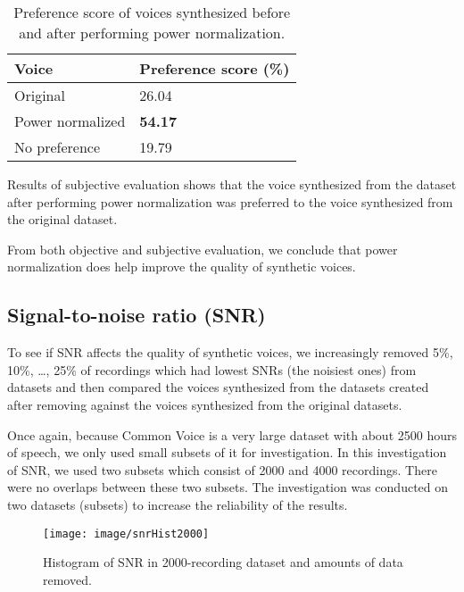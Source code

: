 \documentclass[12pt]{article}
\begin{document}
\begin{table}[]
\begin{center}
\caption{Preference score of voices synthesized before and after performing power normalization.}
\label{tab_subEvaPower}
\vspace{3mm}
\begin{tabular}{|l|l|}
\hline
Voice & Preference score (\%) \\
\hline
Original          & 26.04 \\
Power normalized  & \textbf{54.17} \\
No preference     & 19.79 \\
\hline
\end{tabular}
\end{center}
\end{table}

Results of subjective evaluation shows that the voice synthesized from the dataset after performing power normalization was preferred to the voice synthesized from the original dataset.

From both objective and subjective evaluation, we conclude that power normalization does help improve the quality of synthetic voices.

\subsection{Signal-to-noise ratio (SNR)}
To see if SNR affects the quality of synthetic voices, we increasingly removed 5\%, 10\%, …, 25\% of recordings which had lowest SNRs (the noisiest ones) from datasets and then compared the voices synthesized from the datasets created after removing against the voices synthesized from the original datasets.

Once again, because Common Voice is a very large dataset with about 2500 hours of speech, we only used small subsets of it for investigation. In this investigation of SNR, we used two subsets which consist of 2000 and 4000 recordings. There were no overlaps between these two subsets. The investigation was conducted on two datasets (subsets) to increase the reliability of the results.

\begin{figure}[t]
\begin{center}
\texttt{[image: image/snrHist2000]}
\end{center}
\vspace{-0.3cm}
\caption[Histogram of SNR in 2000-recording dataset and amounts of data removed.]{Histogram of SNR in 2000-recording dataset and amounts of data removed.}
\label{fig_snrHist2000}
\end{figure}
\end{document}
